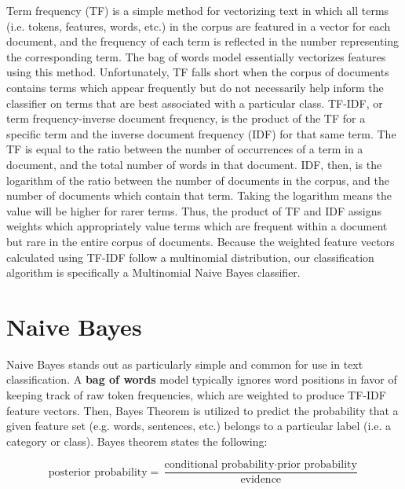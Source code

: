 \documentclass[11pt, twoside, reqno]{book}
\begin{document}
Term frequency (TF) is a simple method for vectorizing text in which all terms (i.e. tokens, features, words, etc.) in the corpus are featured in a vector for each document, and the frequency of each term is reflected in the number representing the corresponding term. The bag of words model essentially vectorizes features using this method. Unfortunately, TF falls short when the corpus of documents contains terms which appear frequently but do not necessarily help inform the classifier on terms that are best associated with a particular class. TF-IDF, or term frequency-inverse document frequency, is the product of the TF for a specific term and the inverse document frequency (IDF) for that same term. The TF is equal to the ratio between the number of occurrences of a term in a document, and the total number of words in that document. IDF, then, is the logarithm of the ratio between the number of documents in the corpus, and the number of documents which contain that term. Taking the logarithm means the value will be higher for rarer terms. Thus, the product of TF and IDF assigns weights which appropriately value terms which are frequent within a document but rare in the entire corpus of documents. Because the weighted feature vectors calculated using TF-IDF follow a multinomial distribution, our classification algorithm is specifically a Multinomial Naive Bayes classifier.

\section{Naive Bayes}
\label{naive_bayes}

Naive Bayes stands out as particularly simple and common for use in text classification. A \textbf{bag of words} model typically ignores word positions in favor of keeping track of raw token frequencies, which are weighted to produce TF-IDF feature vectors. Then, Bayes Theorem is utilized to predict the probability that a given feature set (e.g. words, sentences, etc.) belongs to a particular label (i.e. a category or class). Bayes theorem states the following:

\[\text{posterior probability}=\frac{\text{conditional probability} \cdot \text{prior probability}}{\text{evidence}}\] 
\end{document}
